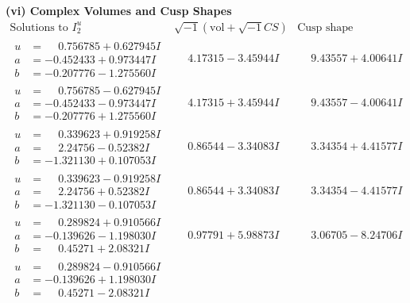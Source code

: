 \documentclass[1p]{elsarticle_modified}
\theoremstyle{definition}
\newcommand{\I}{\sqrt{-1}}
\begin{document}
\newpage\flushleft \textbf{(vi) Complex Volumes and Cusp Shapes}
$$\begin{array}{c|c|c}  
\text{Solutions to }I^u_{2}& \I (\text{vol} + \sqrt{-1}CS) & \text{Cusp shape}\\
 \hline 
\begin{aligned}
u &= \phantom{-}0.756785 + 0.627945 I \\
a &= -0.452433 + 0.973447 I \\
b &= -0.207776 - 1.275560 I\end{aligned}
 & \phantom{-}4.17315 - 3.45944 I & \phantom{-}9.43557 + 4.00641 I \\ \hline\begin{aligned}
u &= \phantom{-}0.756785 - 0.627945 I \\
a &= -0.452433 - 0.973447 I \\
b &= -0.207776 + 1.275560 I\end{aligned}
 & \phantom{-}4.17315 + 3.45944 I & \phantom{-}9.43557 - 4.00641 I \\ \hline\begin{aligned}
u &= \phantom{-}0.339623 + 0.919258 I \\
a &= \phantom{-}2.24756 - 0.52382 I \\
b &= -1.321130 + 0.107053 I\end{aligned}
 & \phantom{-}0.86544 - 3.34083 I & \phantom{-}3.34354 + 4.41577 I \\ \hline\begin{aligned}
u &= \phantom{-}0.339623 - 0.919258 I \\
a &= \phantom{-}2.24756 + 0.52382 I \\
b &= -1.321130 - 0.107053 I\end{aligned}
 & \phantom{-}0.86544 + 3.34083 I & \phantom{-}3.34354 - 4.41577 I \\ \hline\begin{aligned}
u &= \phantom{-}0.289824 + 0.910566 I \\
a &= -0.139626 - 1.198030 I \\
b &= \phantom{-}0.45271 + 2.08321 I\end{aligned}
 & \phantom{-}0.97791 + 5.98873 I & \phantom{-}3.06705 - 8.24706 I \\ \hline\begin{aligned}
u &= \phantom{-}0.289824 - 0.910566 I \\
a &= -0.139626 + 1.198030 I \\
b &= \phantom{-}0.45271 - 2.08321 I\end{aligned}

\end{array}$$
\end{document}

